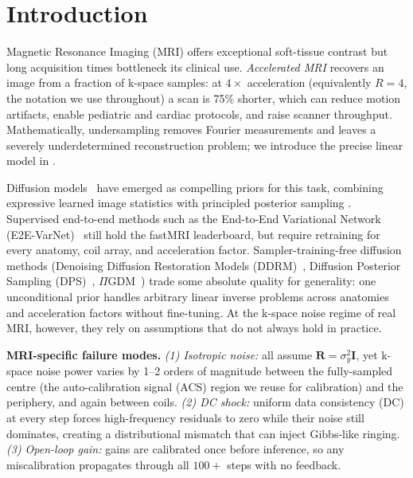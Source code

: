 \documentclass[10pt,twocolumn,letterpaper]{article}
\begin{document}
\section{Introduction}
\label{sec:intro}

Magnetic Resonance Imaging (MRI) offers exceptional soft-tissue contrast but
long acquisition times bottleneck its clinical use. \emph{Accelerated MRI}
recovers an image from a fraction of k-space samples: at $4\times$
acceleration (equivalently $R{=}4$, the notation we use throughout) a scan is
75\% shorter, which can reduce motion artifacts, enable
pediatric and cardiac protocols, and raise scanner throughput. Mathematically,
undersampling removes Fourier measurements and leaves a severely underdetermined
reconstruction problem; we introduce the precise linear model in
.

Diffusion models~\cite{ho2020ddpm,song2021score,karras2022edm} have emerged
as compelling priors for this task, combining expressive learned image
statistics with principled posterior sampling
\cite{jalal2021robust,chung2022scoremri}. Supervised end-to-end methods such
as the End-to-End Variational Network
(E2E-VarNet)~\cite{sriram2020varnet} still hold the fastMRI leaderboard,
but require retraining for every anatomy, coil array, and acceleration
factor. Sampler-training-free diffusion methods
(Denoising Diffusion Restoration Models (DDRM)~\cite{kawar2022ddrm},
Diffusion Posterior Sampling (DPS)~\cite{chung2023dps},
$\Pi$GDM~\cite{song2023pigdm}) trade some absolute quality for generality:
one unconditional prior handles arbitrary linear inverse problems across
anatomies and acceleration factors without fine-tuning. At the k-space noise
regime of real MRI, however, they rely on assumptions that do not always
hold in practice.

\textbf{MRI-specific failure modes.}
\textit{(1) Isotropic noise:} all assume $\mathbf{R}=\sigma_y^2\mathbf{I}$,
yet k-space noise power varies by 1--2 orders of magnitude between the
fully-sampled centre (the auto-calibration signal (ACS) region we reuse for
calibration) and the periphery, and again between coils.
\textit{(2) DC shock:} uniform data consistency (DC) at every step forces
high-frequency residuals to zero while their noise still dominates,
creating a distributional mismatch that can inject Gibbs-like ringing.
\textit{(3) Open-loop gain:} gains are calibrated once before inference, so
any miscalibration propagates through all $100{+}$ steps with no feedback.
\end{document}
